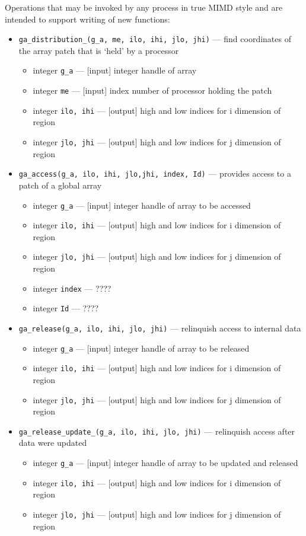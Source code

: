 Operations that may be invoked by any process in true MIMD style and
are intended to support writing of new functions:
\begin{itemize}
\item {\tt ga\_distribution\_(g\_a, me, ilo, ihi, jlo, jhi)} --- find coordinates of the array patch
  that is `held' by a processor
\begin{itemize}
\item     integer {\tt g\_a}         --- [input] integer handle of array
\item     integer {\tt me}          --- [input] index number of processor holding the patch
\item     integer {\tt ilo, ihi}    --- [output] high and low indices for i dimension of region
\item     integer {\tt jlo, jhi}    --- [output] high and low indices for j dimension of region
\end{itemize}

\item {\tt ga\_access(g\_a, ilo, ihi, jlo,jhi, index, Id)} --- provides access to a patch of a global array
\begin{itemize}
\item     integer {\tt g\_a}         --- [input] integer handle of array to be accessed
\item     integer {\tt ilo, ihi}    --- [output] high and low indices for i dimension of region
\item     integer {\tt jlo, jhi}    --- [output] high and low indices for j dimension of region
\item     integer {\tt index}       ---  ????
\item     integer {\tt Id}          ---  ????
\end{itemize}

\item {\tt ga\_release(g\_a, ilo, ihi, jlo, jhi)} --- relinquish access to internal data
\begin{itemize}
\item     integer {\tt g\_a}         --- [input] integer handle of array to be released
\item     integer {\tt ilo, ihi}    --- [output] high and low indices for i dimension of region
\item     integer {\tt jlo, jhi}    --- [output] high and low indices for j dimension of region
\end{itemize}

\item {\tt ga\_release\_update\_(g\_a, ilo, ihi, jlo, jhi)} --- relinquish access after data were
  updated
\begin{itemize}
\item     integer {\tt g\_a}         --- [input] integer handle of array to be updated and released
\item     integer {\tt ilo, ihi}    --- [output] high and low indices for i dimension of region
\item     integer {\tt jlo, jhi}    --- [output] high and low indices for j dimension of region
\end{itemize}


\end{itemize}
